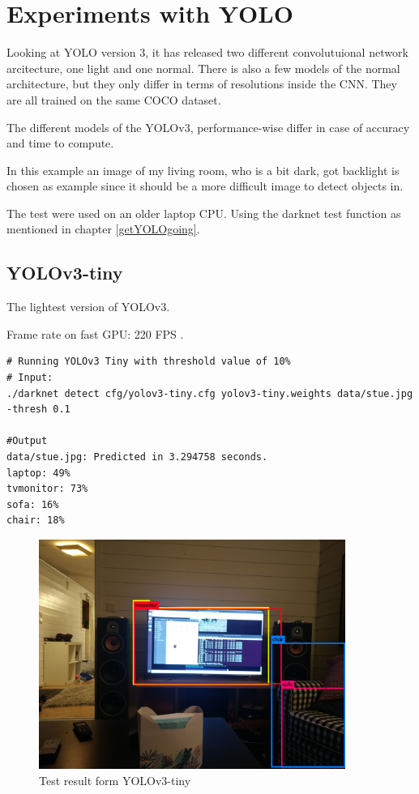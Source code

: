 \newpage

\section{Experiments with YOLO}
Looking at YOLO version 3, it has released two different convolutuional network arcitecture, one light and one normal. There is also a few models of the normal architecture, but they only differ in terms of resolutions inside the CNN. They are all trained on the same COCO dataset.

The different models of the YOLOv3, performance-wise differ in case of accuracy and time to compute.

In this example an image of my living room, who is a bit dark, got backlight is chosen as example since it should be a more difficult image to detect objects in.

The test were used on an older laptop CPU. Using the darknet test function as mentioned in chapter \ref{getYOLOgoing}.

\subsection*{YOLOv3-tiny}
The lightest version of YOLOv3.

Frame rate on fast GPU: 220 FPS \cite{yolo_res}.
\begin{lstlisting}[frame=single]
# Running YOLOv3 Tiny with threshold value of 10% 
# Input:
./darknet detect cfg/yolov3-tiny.cfg yolov3-tiny.weights data/stue.jpg -thresh 0.1

#Output
data/stue.jpg: Predicted in 3.294758 seconds.
laptop: 49%
tvmonitor: 73%
sofa: 16%
chair: 18%
\end{lstlisting}

\begin{figure}[h]
    \centering
        \includegraphics[width=10cm]{experiment_files/YOLOv3_tiny.jpg}
    \caption{Test result form YOLOv3-tiny }
    \label{fig:YOLOv3_tiny}
\end{figure}


